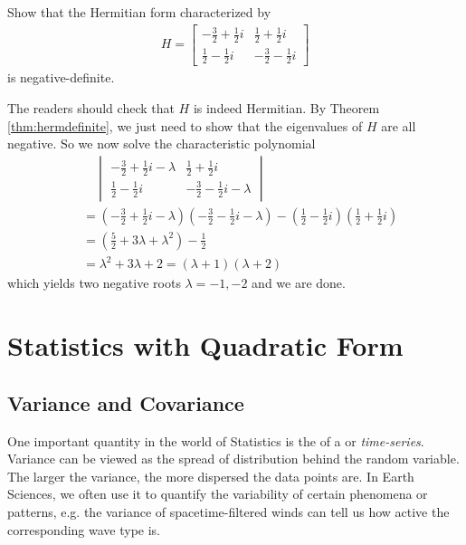 \begin{exmp}
Show that the Hermitian form characterized by
\begin{align*}
H =
\begin{bmatrix}
-\frac{3}{2}+\frac{1}{2}i & \frac{1}{2}+\frac{1}{2}i \\ 
\frac{1}{2}-\frac{1}{2}i & -\frac{3}{2}-\frac{1}{2}i
\end{bmatrix}
\end{align*}
is negative-definite.
\end{exmp}
\begin{solution}
The readers should check that $H$ is indeed Hermitian. By Theorem \ref{thm:hermdefinite}, we just need to show that the eigenvalues of $H$ are all negative. So we now solve the characteristic polynomial
\begin{align*}
&\quad \begin{vmatrix}
-\frac{3}{2}+\frac{1}{2}i -\lambda & \frac{1}{2}+\frac{1}{2}i \\ 
\frac{1}{2}-\frac{1}{2}i & -\frac{3}{2}-\frac{1}{2}i - \lambda
\end{vmatrix} \\
&= (-\frac{3}{2}+\frac{1}{2}i -\lambda)(-\frac{3}{2}-\frac{1}{2}i - \lambda) - (\frac{1}{2}-\frac{1}{2}i)(\frac{1}{2}+\frac{1}{2}i) \\
&= (\frac{5}{2} + 3\lambda + \lambda^2) - \frac{1}{2} \\
&= \lambda^2 + 3\lambda + 2 = (\lambda + 1)(\lambda + 2)
\end{align*}
which yields two negative roots $\lambda = -1, -2$ and we are done.
\end{solution}

\section{Statistics with Quadratic Form}

\subsection{Variance and Covariance}
\label{section:variancesec}
One important quantity in the world of Statistics is the  of a  or \textit{time-series}. Variance can be viewed as the spread of distribution behind the random variable. The larger the variance, the more dispersed the data points are. In Earth Sciences, we often use it to quantify the variability of certain phenomena or patterns, e.g. the variance of spacetime-filtered winds can tell us how active the corresponding wave type is.

